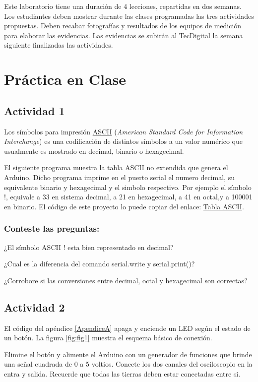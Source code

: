 Este laboratorio tiene una duración de 4 lecciones, repartidas en dos semanas. Los estudiantes deben mostrar durante las clases programadas las tres actividades propuestas. Deben recabar fotografías y resultados de los equipos de medición para elaborar las evidencias. Las evidencias se subirán al TecDigital la semana siguiente finalizadas las actividades.

\section{Práctica en Clase}

\subsection{Actividad 1}
\label{l2:a1}
Los símbolos  para impresión \href{https://www.unicode.org/charts/PDF/U0000.pdf}{ASCII} (\textit{American Standard Code for Information Interchange}) es una codificación de distintos símbolos a un valor numérico que usualmente es mostrado en decimal, binario o hexagecimal.

El siguiente programa muestra la tabla ASCII no extendida que genera el Arduino. Dicho programa imprime en el puerto serial el numero decimal, su equivalente binario y hexagecimal y el simbolo respectivo. Por ejemplo el símbolo !, equivale a 33 en sistema decimal, a 21 en hexagecimal, a 41 en octal,y a 100001 en binario. El código de este proyecto lo puede copiar del enlace: \href{https://docs.arduino.cc/built-in-examples/communication/ASCIITable}{Tabla ASCII}.
 
\subsubsection{Conteste las preguntas:}
¿El símbolo ASCII ! esta bien representado en decimal?

¿Cual es la diferencia del comando serial.write y serial.print()?

¿Corrobore si las conversiones entre decimal, octal y hexagecimal son correctas?

\subsection{Actividad 2}
El  código del apéndice \ref{ApendiceA} apaga y enciende un LED según el estado de un botón. La figura \ref{fig:fig1} muestra el esquema básico de conexión.

Elimine el botón y alimente el Arduino con un generador de funciones que brinde una señal cuadrada de 0 a 5 voltios. Conecte los dos canales del osciloscopio en la  entra y salida. Recuerde que todas las tierras deben estar conectadas entre si. 


